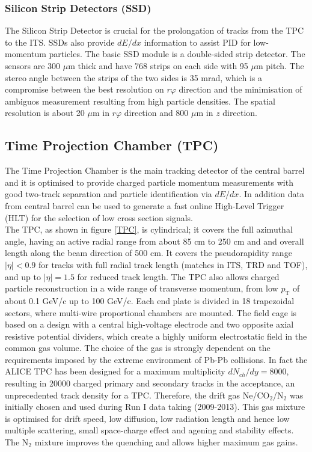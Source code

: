 \documentclass[b5paper,10pt,twoside,oldstyle,classica]{toptesi}
\newcommand{\pt}{p_\text{T}}
\begin{document}
\subsubsection{Silicon Strip Detectors (SSD)}
The Silicon Strip Detector is crucial for the prolongation of tracks from the TPC to the ITS. SSDs also provide $dE/dx$ information to assist PID for low-momentum particles. 
The basic SSD module is a double-sided strip detector. The sensors are 300 $\mu$m thick and have 768 strips on each side with 95 $\mu$m pitch. The stereo angle between the strips of the two sides is 35 mrad, which is a compromise between the best resolution on $r\varphi$ direction and the minimisation of ambiguos measurement resulting from high particle densities.
The spatial resolution is about 20 $\mu$m in $r\varphi$ direction and 800 $\mu$m in $z$ direction. 
\subsection{Time Projection Chamber (TPC)}
The Time Projection Chamber \cite{Schmidt:2010zzc} is the main tracking detector of the central barrel and it is optimised to provide charged particle momentum measurements with good two-track separation and particle identification via $dE/dx$. In addition data from central barrel can be used to generate a fast online High-Level Trigger (HLT) for the selection of low cross section signals.\\
The TPC, as shown in figure \ref{TPC}, is cylindrical; it covers the full azimuthal angle, having an active radial range from about 85 cm to 250 cm and and overall length along the beam direction of 500 cm. It covers the pseudorapidity range $|\eta| < 0.9$ for tracks with full radial track length (matches in ITS, TRD and TOF), and up to $|\eta| = 1.5$ for reduced track length. The TPC also allows charged particle reconstruction in a wide range of transverse momentum, from low $\pt$ of about 0.1 GeV/c up to 100 GeV/c. Each end plate is divided in 18 trapezoidal sectors, where multi-wire proportional chambers are mounted. The field cage is based on a design with a central high-voltage electrode and two opposite axial resistive potential dividers, which create a highly uniform electrostatic field in the common gas volume.
The choice of the gas is strongly dependent on the requirements imposed by the extreme environment of Pb-Pb collisions. In fact the ALICE TPC has been designed for a maximum multiplicity $dN_{ch}/dy = 8000$, resulting in 20000 charged primary and secondary tracks in the acceptance, an unprecedented track density for a TPC. Therefore, the drift gas Ne/CO$_2$/N$_2$ was initially chosen and used during Run I data taking (2009-2013). This gas mixture is optimised for drift speed, low diffusion, low radiation length and hence low multiple scattering, small space-charge effect and agening and stability effects. The N$_2$ mixture improves the quenching and allows higher maximum gas gains. 
\end{document}
